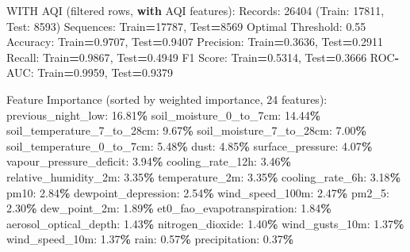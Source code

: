 \documentclass[
  letterpaper,
  DIV=11,
  numbers=noendperiod]{scrartcl}
\newenvironment{Shaded}{\begin{snugshade}}{\end{snugshade}}
\newcommand{\BuiltInTok}[1]{#1}
\newcommand{\ControlFlowTok}[1]{\textcolor[rgb]{0.13,0.29,0.53}{\textbf{#1}}}
\newcommand{\DecValTok}[1]{\textcolor[rgb]{0.00,0.00,0.81}{#1}}
\newcommand{\FloatTok}[1]{\textcolor[rgb]{0.00,0.00,0.81}{#1}}
\newcommand{\NormalTok}[1]{#1}
\newcommand{\OperatorTok}[1]{\textcolor[rgb]{0.81,0.36,0.00}{\textbf{#1}}}
\begin{document}
\begin{Shaded}
\begin{Highlighting}[]
\NormalTok{WITH AQI (filtered rows, }\ControlFlowTok{with}\NormalTok{ AQI features):}
\NormalTok{  Records: }\DecValTok{26404}\NormalTok{ (Train: }\DecValTok{17811}\NormalTok{, Test: }\DecValTok{8593}\NormalTok{)}
\NormalTok{  Sequences: Train}\OperatorTok{=}\DecValTok{17787}\NormalTok{, Test}\OperatorTok{=}\DecValTok{8569}
\NormalTok{  Optimal Threshold: }\FloatTok{0.55}
\NormalTok{  Accuracy: Train}\OperatorTok{=}\FloatTok{0.9707}\NormalTok{, Test}\OperatorTok{=}\FloatTok{0.9407}
\NormalTok{  Precision: Train}\OperatorTok{=}\FloatTok{0.3636}\NormalTok{, Test}\OperatorTok{=}\FloatTok{0.2911}
\NormalTok{  Recall: Train}\OperatorTok{=}\FloatTok{0.9867}\NormalTok{, Test}\OperatorTok{=}\FloatTok{0.4949}
\NormalTok{  F1 Score: Train}\OperatorTok{=}\FloatTok{0.5314}\NormalTok{, Test}\OperatorTok{=}\FloatTok{0.3666}
\NormalTok{  ROC}\OperatorTok{{-}}\NormalTok{AUC: Train}\OperatorTok{=}\FloatTok{0.9959}\NormalTok{, Test}\OperatorTok{=}\FloatTok{0.9379}

\NormalTok{  Feature Importance (}\BuiltInTok{sorted}\NormalTok{ by weighted importance, }\DecValTok{24}\NormalTok{ features):}
\NormalTok{    previous\_night\_low: }\FloatTok{16.81}\OperatorTok{\%}
\NormalTok{    soil\_moisture\_0\_to\_7cm: }\FloatTok{14.44}\OperatorTok{\%}
\NormalTok{    soil\_temperature\_7\_to\_28cm: }\FloatTok{9.67}\OperatorTok{\%}
\NormalTok{    soil\_moisture\_7\_to\_28cm: }\FloatTok{7.00}\OperatorTok{\%}
\NormalTok{    soil\_temperature\_0\_to\_7cm: }\FloatTok{5.48}\OperatorTok{\%}
\NormalTok{    dust: }\FloatTok{4.85}\OperatorTok{\%}
\NormalTok{    surface\_pressure: }\FloatTok{4.07}\OperatorTok{\%}
\NormalTok{    vapour\_pressure\_deficit: }\FloatTok{3.94}\OperatorTok{\%}
\NormalTok{    cooling\_rate\_12h: }\FloatTok{3.46}\OperatorTok{\%}
\NormalTok{    relative\_humidity\_2m: }\FloatTok{3.35}\OperatorTok{\%}
\NormalTok{    temperature\_2m: }\FloatTok{3.35}\OperatorTok{\%}
\NormalTok{    cooling\_rate\_6h: }\FloatTok{3.18}\OperatorTok{\%}
\NormalTok{    pm10: }\FloatTok{2.84}\OperatorTok{\%}
\NormalTok{    dewpoint\_depression: }\FloatTok{2.54}\OperatorTok{\%}
\NormalTok{    wind\_speed\_100m: }\FloatTok{2.47}\OperatorTok{\%}
\NormalTok{    pm2\_5: }\FloatTok{2.30}\OperatorTok{\%}
\NormalTok{    dew\_point\_2m: }\FloatTok{1.89}\OperatorTok{\%}
\NormalTok{    et0\_fao\_evapotranspiration: }\FloatTok{1.84}\OperatorTok{\%}
\NormalTok{    aerosol\_optical\_depth: }\FloatTok{1.43}\OperatorTok{\%}
\NormalTok{    nitrogen\_dioxide: }\FloatTok{1.40}\OperatorTok{\%}
\NormalTok{    wind\_gusts\_10m: }\FloatTok{1.37}\OperatorTok{\%}
\NormalTok{    wind\_speed\_10m: }\FloatTok{1.37}\OperatorTok{\%}
\NormalTok{    rain: }\FloatTok{0.57}\OperatorTok{\%}
\NormalTok{    precipitation: }\FloatTok{0.37}\OperatorTok{\%}


\end{Highlighting}
\end{Shaded}
\end{document}
